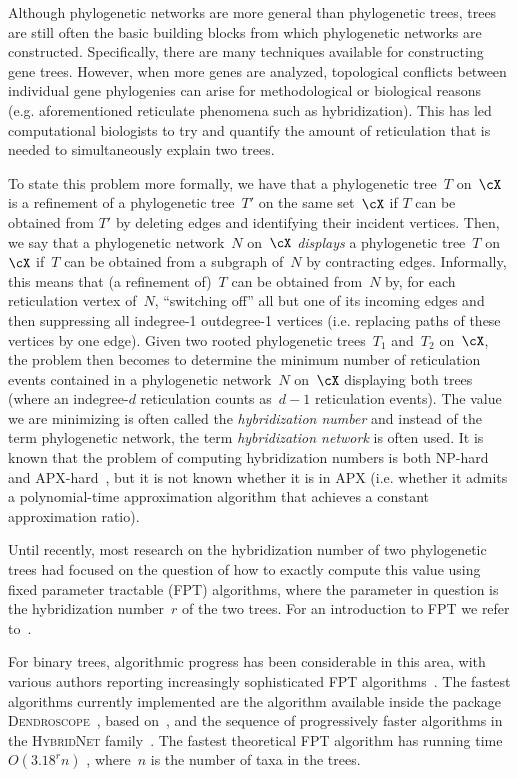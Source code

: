 {Although phylogenetic networks are more general than phylogenetic trees, trees are still often the basic building blocks from which phylogenetic networks are constructed. Specifically, there are many techniques available for constructing gene trees. However, when more genes are analyzed, topological conflicts between individual gene phylogenies can arise for methodological or biological reasons (e.g. aforementioned reticulate phenomena such as hybridization). This has led computational biologists to try and quantify the amount of reticulation that is needed to simultaneously explain two trees.

To state this problem more formally, {we have that a  phylogenetic tree~$T$ on~$\cX$ is a refinement of a  phylogenetic tree~$T'$ on the same set~$\cX$ if $T$ can be obtained from $T'$ by deleting edges and identifying their incident vertices. Then,} 
we say that a phylogenetic network~$N$ on~$\cX$ \emph{displays} a phylogenetic tree~$T$ on~$\cX$ if~$T$ can be obtained from a subgraph of~$N$ by contracting edges. Informally, this means that (a refinement of)~$T$ can be obtained from~$N$ by, for each reticulation vertex of~$N$, ``switching off'' all but one of its incoming edges and then suppressing all indegree-1 outdegree-1 vertices ({i.e. replacing paths of these vertices by one edge}). Given two rooted phylogenetic trees~$T_1$ and~$T_2$ on~$\cX$, the problem then becomes to determine the minimum number of reticulation events contained in a phylogenetic network~$N$ on~$\cX$ displaying both trees (where an indegree-$d$ reticulation counts as~$d-1$ reticulation events). The value we are minimizing is often called the \emph{hybridization number} and instead of the term phylogenetic network, the term \emph{hybridization network} is often used. It is known that the problem of computing hybridization numbers is both NP-hard and APX-hard~\cite{
bordewich07a}, but it is not known whether it is in APX (i.e. whether it admits a polynomial-time approximation algorithm that achieves a constant approximation ratio).

Until recently, most research on the hybridization number of two phylogenetic trees had focused on the question of how to exactly compute this value using fixed parameter tractable (FPT) algorithms, where the parameter in question is the hybridization number~$r$ of the two trees. For an introduction to FPT we refer to~\cite{Flum2006,DowneyFellows99}.

For binary trees, algorithmic progress has been considerable in this area, with various authors reporting increasingly sophisticated FPT algorithms~\cite{bordewich2,hybridnet,quantifyingreticulation,whiddenFixed}. The fastest algorithms currently implemented are the algorithm available inside the package \textsc{Dendroscope}~\cite{Dendroscope3}, based on~\cite{fastcomputation}, and the sequence of progressively faster algorithms in the \textsc{HybridNet} family~\cite{hybridnet,chen2012algorithms,chen2013ultrafast}. The fastest theoretical FPT algorithm has running time $O( 3.18^{r}n )$ \cite{whiddenFixed}, where~$n$ is the number of taxa in the trees.

}
